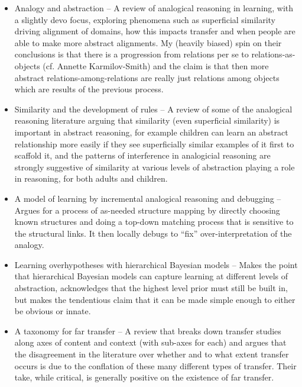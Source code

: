 \documentclass[11pt]{article}
\begin{document}
\begin{itemize}
\item Analogy and abstraction -- A review of analogical reasoning in learning, with a slightly devo focus, exploring phenomena such as superficial similarity driving alignment of domains, how this impacts transfer and when people are able to make more abstract alignments. My (heavily biased) spin on their conclusions is that there is a progression from relations per se to relations-as-objects (cf. Annette Karmilov-Smith) and the claim is that then more abstract relations-among-relations are really just relations among objects which are results of the previous process. \citep{Gentner2017}
\item Similarity and the development of rules -- A review of some of the analogical reasoning literature arguing that similarity (even superficial similarity) is important in abstract reasoning, for example children can learn an abstract relationship more easily if they see superficially similar examples of it first to scaffold it, and the patterns of interference in analogicial reasoning are strongly suggestive of similarity at various levels of abstraction playing a role in reasoning, for both adults and children.
\item A model of learning by incremental analogical reasoning and debugging -- Argues for a process of as-needed structure mapping by directly choosing known structures and doing a top-down matching process that is sensitive to the structural links. It then locally debugs to ``fix'' over-interpretation of the analogy. \citep{Burnstein1983}
\item Learning overhypotheses with hierarchical Bayesian models -- Makes the point that hierarchical Bayesian models can capture learning at different levels of abstraction, acknowledges that the highest level prior must still be built in, but makes the tendentious claim that it can be made simple enough to either be obvious or innate. \citep{Kemp2007}
\item A taxonomy for far transfer -- A review that breaks down transfer studies along axes of content and context (with sub-axes for each) and argues that the disagreement in the literature over whether and to what extent transfer occurs is due to the conflation of these many different types of transfer. Their take, while critical, is generally positive on the existence of far transfer. \citep{Barnett2002}

\end{itemize}
\end{document}
